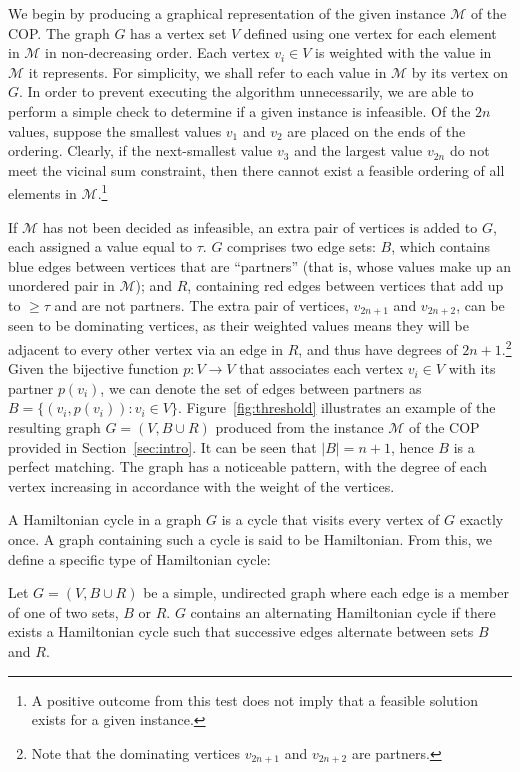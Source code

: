 \documentclass{elsarticle}
\begin{document}
We begin by producing a graphical representation of the given instance $\mathcal{M}$ of the COP. The graph $G$ has a vertex set $V$ defined using one vertex for each element in $\mathcal{M}$ in non-decreasing order. Each vertex $v_i \in V$ is weighted with the value in $\mathcal{M}$ it represents. For simplicity, we shall refer to each value in $\mathcal{M}$ by its vertex on $G$. In order to prevent executing the algorithm unnecessarily, we are able to perform a simple check to determine if a given instance is infeasible. Of the $2n$ values, suppose the smallest values $v_1$ and $v_2$ are placed on the ends of the ordering. Clearly, if the next-smallest value $v_3$ and the largest value $v_{2n}$ do not meet the vicinal sum constraint, then there cannot exist a feasible ordering of all elements in $\mathcal{M}$.\footnote{A positive outcome from this test does not imply that a feasible solution exists for a given instance.}

If $\mathcal{M}$ has not been decided as infeasible, an extra pair of vertices is added to $G$, each assigned a value equal to $\tau$. $G$ comprises two edge sets: $B$, which contains blue edges between vertices that are ``partners'' (that is, whose values make up an unordered pair in $\mathcal{M}$); and $R$, containing red edges between vertices that add up to $\geq \tau$ and are not partners. The extra pair of vertices, $v_{2n+1}$ and $v_{2n+2}$, can be seen to be dominating vertices, as their weighted values means they will be adjacent to every other vertex via an edge in $R$, and thus have degrees of $2n+1$.\footnote{Note that the dominating vertices $v_{2n+1}$ and $v_{2n+2}$ are partners.} Given the bijective function $p : V \to V$ that associates each vertex $v_i \in V$ with its partner $p(v_i)$, we can denote the set of edges between partners as $B = \{(v_i, p(v_i)) : v_i \in V\}$. Figure~\ref{fig:threshold} illustrates an example of the resulting graph $G = (V, B \cup R)$ produced from the instance $\mathcal{M}$ of the COP provided in Section~\ref{sec:intro}. It can be seen that $|B| = n+1$, hence $B$ is a perfect matching. The graph has a noticeable pattern, with the degree of each vertex increasing in accordance with the weight of the vertices.

A Hamiltonian cycle in a graph $G$ is a cycle that visits every vertex of $G$ exactly once. A graph containing such a cycle is said to be Hamiltonian. From this, we define a specific type of Hamiltonian cycle:

\begin{definition}
	\label{defn:althamcycle}
	Let $G = (V, B \cup R)$ be a simple, undirected graph where each edge is a member of one of two sets, $B$ or $R$. $G$ contains an alternating Hamiltonian cycle if there exists a Hamiltonian cycle such that successive edges alternate between sets $B$ and $R$.
\end{definition}
\end{document}
